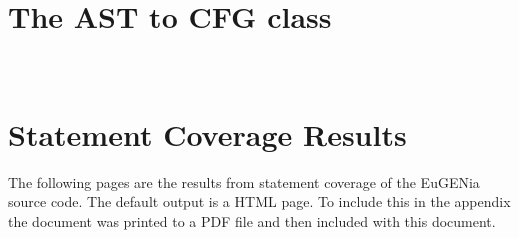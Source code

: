 \chapter{\\The AST to CFG class}
\label{App:SampleEuGENia}
%

%
%
%

\chapter{\\Statement Coverage Results}
\label{App:StatementCoverage}

The following pages are the results from statement coverage of the EuGENia source code. The default output is a HTML page. To include this in the appendix the document was printed to a PDF file and then included with this document.






%
